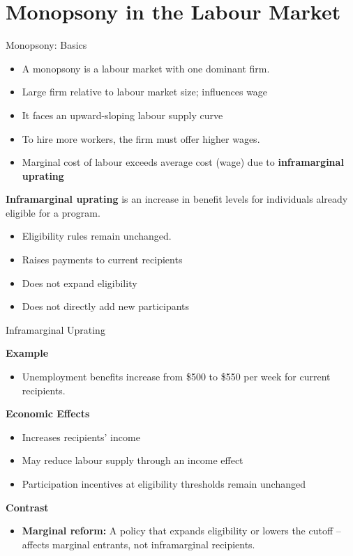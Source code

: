 \documentclass[aspectratio=169]{beamer}
\begin{document}
\section{Monopsony in the Labour Market}

\begin{frame}{Monopsony: Basics}
\transfade
\begin{itemize}
\item  A monopsony is a labour market with one dominant firm.
  \item Large firm relative to labour market size; influences wage

\item It faces an upward-sloping labour supply curve 

\item To hire more workers, the firm must offer higher wages.
  \item Marginal cost of labour exceeds average cost (wage) due to\textbf{ inframarginal uprating}
\end{itemize}

 \textbf{Inframarginal uprating} is an increase in benefit levels for individuals already eligible for a program.
\begin{itemize}
\item Eligibility rules remain unchanged.

\item Raises payments to current recipients
\item Does not expand eligibility
\item Does not directly add new participants
\end{itemize}
\end{frame}

 \begin{frame}{Inframarginal Uprating}




\textbf{Example}
\begin{itemize}
\item Unemployment benefits increase from \$500 to \$550 per week for current recipients.
\end{itemize}

\textbf{Economic Effects}
\begin{itemize}
\item Increases recipients’ income
\item May reduce labour supply through an income effect
\item Participation incentives at eligibility thresholds remain unchanged
\end{itemize}

\textbf{Contrast}
\begin{itemize}
\item \textbf{Marginal reform:} A policy that expands eligibility or lowers the cutoff -- affects marginal entrants, not inframarginal recipients.
\end{itemize}

\end{frame}
\end{document}
